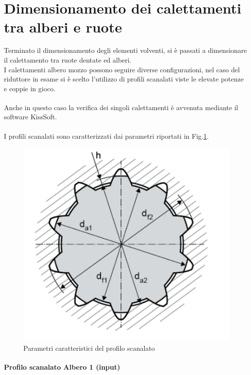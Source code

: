 \section{Dimensionamento dei calettamenti tra alberi e ruote}
Terminato il dimensionamento degli elementi volventi, si è passati a dimensionare il calettamento tra ruote dentate ed alberi.\\
I calettamenti albero mozzo possono seguire diverse configurazioni, nel caso del riduttore in esame si è scelto l'utilizzo di profili scanalati viste le elevate potenze e coppie in gioco.\\
\\
Anche in questo caso la verifica dei singoli calettamenti è avvenuta mediante il software KissSoft. \\
\\
I profili scanalati sono caratterizzati dai parametri riportati in Fig.\ref{fig:ScanalatoGenerico}.
\begin{figure}[h]
    \centering
    \includegraphics[scale=0.5]{Immagini/ScanalatoGenerico.png}
    \caption{Parametri caratteristici del profilo scanalato}
    \label{fig:ScanalatoGenerico}
\end{figure}

\paragraph{Profilo scanalato Albero 1 (input)}

